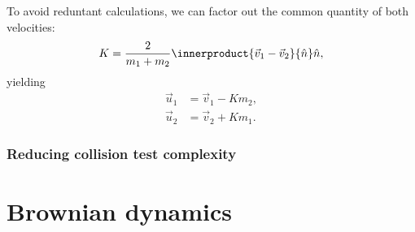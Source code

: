 To avoid reduntant calculations, we can factor out the common quantity of both velocities:
\begin{equation}
	K = \frac{2}{m_{1}+m_{2}}\innerproduct{\vec{v}_{1}-\vec{v}_{2}}{\hat{n}}\hat{n},
	\label{eq:elastic_collision_common_quantity}
\end{equation}
yielding
\begin{equation}
	\begin{aligned}
		\vec{u}_{1} & = \vec{v}_{1}-Km_{2}, \\
		\vec{u}_{2} & = \vec{v}_{2}+Km_{1}.
	\end{aligned}
	\label{eq:elastic_collision_final_equation}
\end{equation}

\subsubsection{Reducing collision test complexity}

\section{Brownian dynamics}
